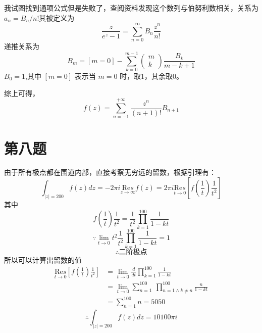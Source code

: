 \documentclass[a4paper]{ctexart}
\begin{document}
我试图找到通项公式但是失败了，查阅资料发现这个数列与伯努利数相关，关系为$a_n=B_n/n!$其被定义为
$$\frac{z}{e^{z}-1}=\sum_{n=0}^{\infty} B_{n} \frac{z^{n}}{n !}$$
递推关系为
$$B_{m}=[m=0]-\sum_{k=0}^{m-1}\left(\begin{array}{c}
            m \\
            k
        \end{array}\right) \frac{B_{k}}{m-k+1}$$
$B_0=1$,其中 $[m=0]$ 表示当 $m=0$ 时，取1，其余取0。

综上可得，
$$
    f\left( z \right) =\sum_{n=-1}^{+\infty}{\frac{z^n}{\left( n+1 \right) !}B_{n+1}}
$$

\section{第八题}
由于所有极点都在围道内部，直接考察无穷远的留数，根据引理有：
$$
    \int_{|z|=200}{f\left( z \right) dz}=-2\pi i\underset{z\rightarrow \infty}{\text{Re}s}f\left( z \right) =2\pi i\underset{t\rightarrow 0}{\text{Re}s}\left[ f\left( \frac{1}{t} \right) \frac{1}{t^2} \right]
$$
其中
$$
    f\left( \frac{1}{t} \right) \frac{1}{t^2}=\frac{1}{t^2}\prod_{k=1}^{100}{\frac{1}{1-kt}}
$$
$$
    \because \underset{t\rightarrow 0}{\lim}t^2\frac{1}{t^2}\prod_{k=1}^{100}{\frac{1}{1-kt}}=1
$$
$$
    \therefore \text{二阶极点}
$$
所以可以计算出留数的值
$$
    \begin{aligned}
        \underset{t\rightarrow 0}{\text{Re}s}\left[ f\left( \frac{1}{t} \right) \frac{1}{t^2} \right]
         & =\underset{t\rightarrow 0}{\lim}\frac{d}{dt}\prod_{k=1}^{100}{\frac{1}{1-kt}}                      \\
         & =\underset{t\rightarrow 0}{\lim}\sum_{n=1}^{100}{\ \prod_{n=1 \land k\ne n}^{100}{\frac{n}{1-kt}}} \\
         & =\sum_{n=1}^{100}{n}=5050
    \end{aligned}
$$
$$
    \therefore \int_{|z|=200}{f\left( z \right) dz}=10100\pi i
$$
\end{document}
